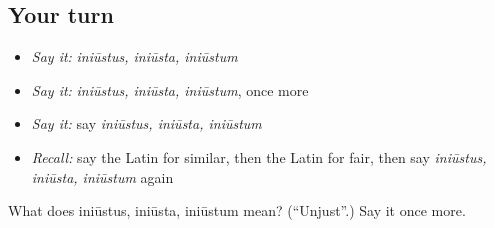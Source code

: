 \subsection*{Your turn}
\begin{itemize}
\raggedright
  \item \emph{Say it:} \emph{iniūstus, iniūsta, iniūstum}
  \item \emph{Say it:} \emph{iniūstus, iniūsta, iniūstum}, once more
  \item \emph{Say it:} say \emph{iniūstus, iniūsta, iniūstum}
  \item \emph{Recall:} say the Latin for similar, then the Latin for fair, then say \emph{iniūstus, iniūsta, iniūstum} again
\end{itemize}

\begin{tcolorbox}[breakable,colback=teal!4,colframe=teal!35!black,title={Before you move on}]
What does iniūstus, iniūsta, iniūstum mean? (\textquotedblleft{}Unjust\textquotedblright{}.) Say it once more.
\end{tcolorbox}
